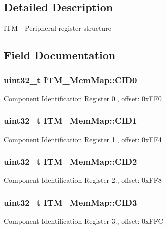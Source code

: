\subsection{Detailed Description}
I\+T\+M -\/ Peripheral register structure 

\subsection{Field Documentation}
\hypertarget{struct_i_t_m___mem_map_aa106970486025d57f6bd43ce99ce1b2a}{}
\subsubsection[{C\+I\+D0}]{\setlength{\rightskip}{0pt plus 5cm}uint32\+\_\+t I\+T\+M\+\_\+\+Mem\+Map\+::\+C\+I\+D0}\label{struct_i_t_m___mem_map_aa106970486025d57f6bd43ce99ce1b2a}
Component Identification Register 0., offset\+: 0x\+F\+F0 \hypertarget{struct_i_t_m___mem_map_ac41c2c8d78aa8c7bf579da2e2b587a76}{}
\subsubsection[{C\+I\+D1}]{\setlength{\rightskip}{0pt plus 5cm}uint32\+\_\+t I\+T\+M\+\_\+\+Mem\+Map\+::\+C\+I\+D1}\label{struct_i_t_m___mem_map_ac41c2c8d78aa8c7bf579da2e2b587a76}
Component Identification Register 1., offset\+: 0x\+F\+F4 \hypertarget{struct_i_t_m___mem_map_a5048e832d89ab50cad8978e9169bcb9d}{}
\subsubsection[{C\+I\+D2}]{\setlength{\rightskip}{0pt plus 5cm}uint32\+\_\+t I\+T\+M\+\_\+\+Mem\+Map\+::\+C\+I\+D2}\label{struct_i_t_m___mem_map_a5048e832d89ab50cad8978e9169bcb9d}
Component Identification Register 2., offset\+: 0x\+F\+F8 \hypertarget{struct_i_t_m___mem_map_a0cd6f004d85bdf3734763af74927cd2f}{}
\subsubsection[{C\+I\+D3}]{\setlength{\rightskip}{0pt plus 5cm}uint32\+\_\+t I\+T\+M\+\_\+\+Mem\+Map\+::\+C\+I\+D3}\label{struct_i_t_m___mem_map_a0cd6f004d85bdf3734763af74927cd2f}
Component Identification Register 3., offset\+: 0x\+F\+F\+C \hypertarget{struct_i_t_m___mem_map_af3f0dfff8c586620bdb0026aca56fe05}{}
